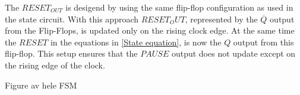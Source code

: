The $RESET_{OUT}$ is desigend by using the same flip-flop configuration as used in the state circuit. With this approach $RESET_OUT$, represented by the $\overline{Q}$ output from the Flip-Flops, is updated only on the rising clock edge. At the same time the $RESET$ in the equations in \ref{State equation}, is now the $Q$ output from this flip-flop. This setup ensures that the $PAUSE$ output does not update except on the rising edge of the clock.


Figure av hele FSM
    


        
    
    

